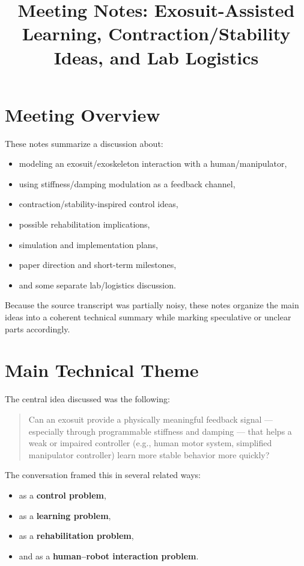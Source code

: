 \documentclass[11pt]{article}
\title{\textbf{Meeting Notes: Exosuit-Assisted Learning, Contraction/Stability Ideas, and Lab Logistics}}
\author{}
\date{}
\begin{document}
\maketitle

\section*{Meeting Overview}
These notes summarize a discussion about:
\begin{itemize}[leftmargin=1.5em]
    \item modeling an exosuit/exoskeleton interaction with a human/manipulator,
    \item using stiffness/damping modulation as a feedback channel,
    \item contraction/stability-inspired control ideas,
    \item possible rehabilitation implications,
    \item simulation and implementation plans,
    \item paper direction and short-term milestones,
    \item and some separate lab/logistics discussion.
\end{itemize}

Because the source transcript was partially noisy, these notes organize the main ideas into a coherent technical summary while marking speculative or unclear parts accordingly.

\section{Main Technical Theme}
The central idea discussed was the following:

\begin{quote}
Can an exosuit provide a physically meaningful feedback signal --- especially through programmable stiffness and damping --- that helps a weak or impaired controller (e.g., human motor system, simplified manipulator controller) learn more stable behavior more quickly?
\end{quote}

The conversation framed this in several related ways:
\begin{itemize}[leftmargin=1.5em]
    \item as a \textbf{control problem},
    \item as a \textbf{learning problem},
    \item as a \textbf{rehabilitation problem},
    \item and as a \textbf{human--robot interaction problem}.
\end{itemize}
\end{document}
